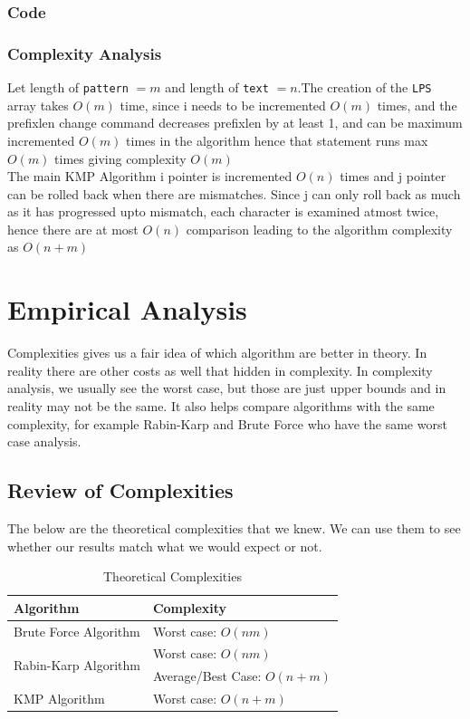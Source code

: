 \documentclass[a4paper, 12pt]{report}
\begin{document}
    \subsection{Code}
    
    
    \subsection{Complexity Analysis}
    Let length of \texttt{pattern} $= m$ and length of \texttt{text} $= n$.The creation of the \texttt{LPS} array takes $O(m)$ time, since i needs to be incremented $O(m)$ times, and the prefixlen change command decreases prefixlen by at least 1, and can be maximum incremented $O(m)$ times in the algorithm hence that statement runs max $O(m)$ times giving complexity $O(m)$
    \\
    The main KMP Algorithm i pointer is incremented $O(n)$ times and j pointer can be rolled back when there are mismatches. Since j can only roll back as much as it has progressed upto mismatch, each character is examined atmost twice, hence there are at most $O(n)$ comparison leading to the algorithm complexity as $O(n+m)$
    \newpage


    \chapter{Empirical Analysis}

    Complexities gives us a fair idea of which algorithm are better in theory. In reality there are other costs as well that hidden in complexity. In complexity analysis, we usually see the worst case, but those are just upper bounds and in reality may not be the same. It also helps compare algorithms with the same complexity, for example Rabin-Karp and Brute Force who have the same worst case analysis.
        \section{Review of Complexities}
        The below are the theoretical complexities that we knew. We can use them to see whether our results match what we would expect or not.
\begin{table}[h]
\centering
\begin{tabular}{|l|l|}
\hline
\textbf{Algorithm}                                          & \textbf{Complexity}       \\ \hline
Brute Force Algorithm                                       & Worst case: $O(nm)$         \\ \hline
\multicolumn{1}{|c|}{\multirow{2}{*}{Rabin-Karp Algorithm}} & Worst case: $O(nm)$         \\ \cline{2-2} 
\multicolumn{1}{|c|}{}                                      & Average/Best Case: $O(n+m)$ \\ \hline
KMP Algorithm                                               & Worst case: $O(n+m)$        \\ \hline
\end{tabular}
\caption{Theoretical Complexities}
\label{tab:Complexities}
\end{table}
\end{document}
